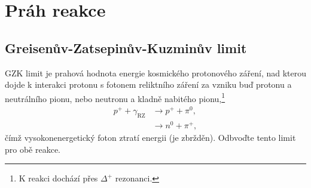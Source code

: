 \section{Práh reakce}
\subsection{Greisenův-Zatsepinův-Kuzminův limit}
    GZK limit je prahová hodnota energie kosmického protonového záření, nad kterou dojde k interakci protonu s fotonem reliktního záření za vzniku buď protonu a neutrálního pionu, nebo neutronu a kladně nabitého pionu,\footnote{
        K reakci dochází přes $\Delta^{+}$ rezonanci.
    }
    \begin{subequations}
        \begin{align}
            p^{+}+\gamma_{\mathrm{RZ}}
                &\longrightarrow p^{+}+\pi^{0},\\
                &\longrightarrow n^{0}+\pi^{+},
        \end{align}        
    \end{subequations}
    čímž vysokonenergetický foton ztratí energii (je zbržděn).
    Odbvoďte tento limit pro obě reakce.

